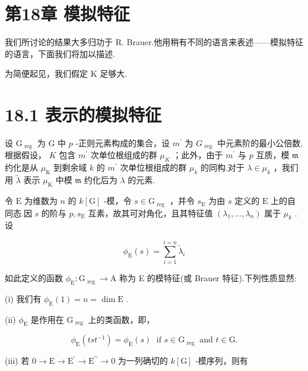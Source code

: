 \documentclass[10pt]{article}
\begin{document}
\section*{第18章 模拟特征}

我们所讨论的结果大多归功于 R. Brauer.他用稍有不同的语言来表述——模拟特征的语言，下面我们将加以描述.

为简便起见，我们假定 \(\mathrm{K}\) 足够大.

\section*{18.1 表示的模拟特征}

设 \({\mathrm{G}}_{\text{ reg }}\) 为 \(\mathrm{G}\) 中 \(p\) -正则元素构成的集合，设 \({m}^{\prime }\) 为 \({G}_{\text{ reg }}\) 中元素阶的最小公倍数.根据假设， \(K\) 包含 \({m}^{\prime }\) 次单位根组成的群 \({\mu }_{K}\) ；此外，由于 \({m}^{\prime }\) 与 \(p\) 互质，模 \(\mathfrak{m}\) 约化是从 \({\mu }_{\mathrm{K}}\) 到剩余域 \(k\) 的 \({m}^{\prime }\) 次单位根组成的群 \({\mu }_{k}\) 的同构.对于 \(\lambda  \in  {\mu }_{k}\) ，我们用 \(\widetilde{\lambda }\) 表示 \({\mu }_{\mathrm{K}}\) 中模 \(\mathfrak{m}\) 约化后为 \(\lambda\) 的元素.

令 \(\mathrm{E}\) 为维数为 \(n\) 的 \(k\left\lbrack  \mathrm{G}\right\rbrack\) -模，令 \(s \in  {\mathrm{G}}_{\text{ reg }}\) ，并令 \({s}_{\mathrm{E}}\) 为由 \(s\) 定义的 \(\mathrm{E}\) 上的自同态.因 \(s\) 的阶与 \(p,{s}_{\mathrm{E}}\) 互素，故其可对角化，且其特征值 \(\left( {{\lambda }_{1},\ldots ,{\lambda }_{n}}\right)\) 属于 \({\mu }_{k}\) .设

\[
{\phi }_{\mathrm{E}}\left( s\right)  = \mathop{\sum }\limits_{{i = 1}}^{{i = n}}{\widetilde{\lambda }}_{i}
\]

如此定义的函数 \({\phi }_{\mathrm{E}} : {\mathrm{G}}_{\text{ reg }} \rightarrow  \mathrm{A}\) 称为 E 的模特征(或 Brauer 特征).下列性质显然:

(i) 我们有 \({\phi }_{\mathrm{E}}\left( 1\right)  = n = \dim \mathrm{E}\) .

(ii) \({\phi }_{\mathrm{E}}\) 是作用在 \({\mathrm{G}}_{\text{ reg }}\) 上的类函数，即，

\[
{\phi }_{\mathrm{E}}\left( {{ts}{t}^{-1}}\right)  = {\phi }_{\mathrm{E}}\left( s\right) \;\text{ if }s \in  {\mathrm{G}}_{\text{ reg }}\text{ and }t \in  \mathrm{G}.
\]

(iii) 若 \(0 \rightarrow  \mathrm{E} \rightarrow  {\mathrm{E}}^{\prime } \rightarrow  {\mathrm{E}}^{\prime \prime } \rightarrow  0\) 为一列确切的 \(k\left\lbrack  \mathrm{G}\right\rbrack\) -模序列，则有
\end{document}
